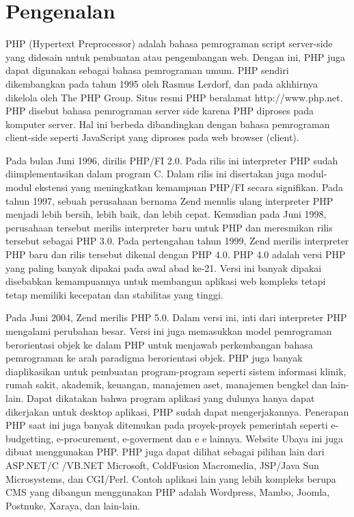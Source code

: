 \section{Pengenalan}
PHP (Hypertext Preprocessor) adalah bahasa pemrograman script server-side yang didesain untuk pembuatan atau pengembangan web.
Dengan ini, PHP juga dapat digunakan sebagai bahasa pemrograman umum. PHP sendiri dikembangkan pada tahun 1995
oleh Rasmus Lerdorf, dan pada akhhirnya dikelola oleh The PHP Group. Situs resmi PHP beralamat http://www.php.net.
PHP disebut bahasa pemrograman server side karena PHP diproses pada komputer server. 
Hal ini berbeda dibandingkan dengan bahasa pemrograman client-side seperti JavaScript yang diproses pada web browser (client).
\par
Pada bulan Juni 1996, dirilis PHP/FI 2.0. Pada rilis ini interpreter PHP sudah diimplementasikan dalam program C. Dalam rilis ini disertakan juga modul-modul ekstensi yang meningkatkan kemampuan PHP/FI secara signifikan. Pada tahun 1997, sebuah perusahaan bernama Zend menulis ulang interpreter PHP menjadi lebih bersih, lebih baik, dan lebih cepat. Kemudian pada Juni 1998, perusahaan tersebut merilis interpreter baru untuk PHP dan meresmikan rilis tersebut sebagai PHP 3.0.
Pada pertengahan tahun 1999, Zend merilis interpreter PHP baru dan rilis tersebut dikenal dengan PHP 4.0. PHP 4.0 adalah versi PHP yang paling banyak dipakai pada awal abad ke-21. Versi ini banyak dipakai disebabkan kemampuannya untuk membangun aplikasi web kompleks tetapi tetap memiliki kecepatan dan stabilitas yang tinggi.
\par
Pada Juni 2004, Zend merilis PHP 5.0. Dalam versi ini, inti dari interpreter PHP mengalami perubahan besar. Versi ini juga memasukkan model pemrograman berorientasi objek ke dalam PHP untuk menjawab perkembangan bahasa pemrograman ke arah paradigma berorientasi objek. PHP juga banyak diaplikasikan untuk pembuatan program-program seperti sistem informasi  klinik, rumah sakit, akademik, keuangan, manajemen aset, manajemen bengkel dan lain-lain. Dapat dikatakan bahwa program aplikasi yang dulunya hanya dapat dikerjakan untuk desktop aplikasi, PHP sudah dapat mengerjakannya. Penerapan PHP saat ini juga banyak ditemukan pada proyek-proyek pemerintah seperti e-budgetting, e-procurement, e-goverment dan e e lainnya. Website Ubaya ini juga dibuat menggunakan PHP. PHP juga dapat dilihat sebagai pilihan lain dari ASP.NET/C /VB.NET Microsoft, ColdFusion Macromedia, JSP/Java Sun Microsystems, dan CGI/Perl. Contoh aplikasi lain yang lebih kompleks berupa CMS yang dibangun menggunakan PHP adalah Wordpress, Mambo, Joomla, Postnuke, Xaraya, dan lain-lain.


